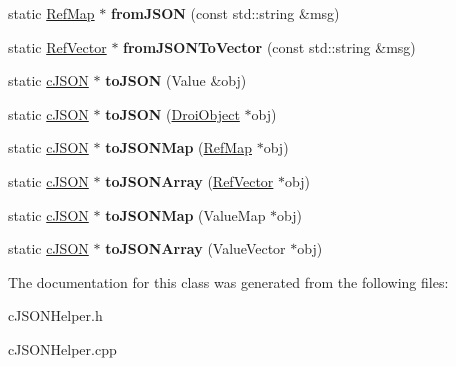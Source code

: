 \begin{DoxyCompactItemize}
\mbox{\label{classc_j_s_o_n_helper_a08c70078556c7ca062e66d25e2598d5a}} 
static \hyperlink{class_ref_map}{Ref\+Map} $\ast$ {\bfseries from\+J\+S\+ON} (const std\+::string \&msg)
\item 
\mbox{\label{classc_j_s_o_n_helper_a81650210febcd692c43fc2ddafacf8e7}} 
static \hyperlink{class_ref_vector}{Ref\+Vector} $\ast$ {\bfseries from\+J\+S\+O\+N\+To\+Vector} (const std\+::string \&msg)
\item 
\mbox{\label{classc_j_s_o_n_helper_a7ce2905270f78a56747162d4a69263b9}} 
static \hyperlink{structc_j_s_o_n}{c\+J\+S\+ON} $\ast$ {\bfseries to\+J\+S\+ON} (Value \&obj)
\item 
\mbox{\label{classc_j_s_o_n_helper_a1bae240d6546f127a75b113ceab240ac}} 
static \hyperlink{structc_j_s_o_n}{c\+J\+S\+ON} $\ast$ {\bfseries to\+J\+S\+ON} (\hyperlink{class_droi_object}{Droi\+Object} $\ast$obj)
\item 
\mbox{\label{classc_j_s_o_n_helper_a876bfff42155fc598fc9e8ec049848bc}} 
static \hyperlink{structc_j_s_o_n}{c\+J\+S\+ON} $\ast$ {\bfseries to\+J\+S\+O\+N\+Map} (\hyperlink{class_ref_map}{Ref\+Map} $\ast$obj)
\item 
\mbox{\label{classc_j_s_o_n_helper_a9d55f5bf2cd643525ba97c06eb20e6d8}} 
static \hyperlink{structc_j_s_o_n}{c\+J\+S\+ON} $\ast$ {\bfseries to\+J\+S\+O\+N\+Array} (\hyperlink{class_ref_vector}{Ref\+Vector} $\ast$obj)
\item 
\mbox{\label{classc_j_s_o_n_helper_a484412322e8e3869fda6fbc999612f15}} 
static \hyperlink{structc_j_s_o_n}{c\+J\+S\+ON} $\ast$ {\bfseries to\+J\+S\+O\+N\+Map} (Value\+Map $\ast$obj)
\item 
\mbox{\label{classc_j_s_o_n_helper_a80c85620a71627c9e1f8239e6b6d21fe}} 
static \hyperlink{structc_j_s_o_n}{c\+J\+S\+ON} $\ast$ {\bfseries to\+J\+S\+O\+N\+Array} (Value\+Vector $\ast$obj)
\end{DoxyCompactItemize}


The documentation for this class was generated from the following files\+:\begin{DoxyCompactItemize}
\item 
c\+J\+S\+O\+N\+Helper.\+h\item 
c\+J\+S\+O\+N\+Helper.\+cpp\end{DoxyCompactItemize}
